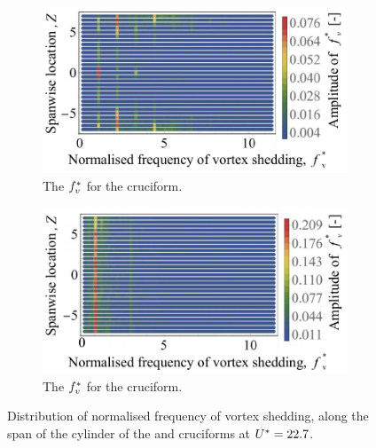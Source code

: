 \documentclass[oneside]{utmthesis}
\begin{document}
\begin{figure}
  \centering

  \begin{subfigure}[h]{0.46\textwidth}
    \includegraphics[width=\textwidth]{figs/probe225YU10}
    \caption{The $f^{*}_{v}$ for the \angtw{} cruciform.}
    \label{fig:probe225YU10}
  \end{subfigure}
  \hspace{6mm}
  \begin{subfigure}[h]{0.46\textwidth}
    \includegraphics[width=\textwidth]{figs/probe00YU10}
    \caption{The $f^{*}_{v}$ for the \angon{} cruciform.}
    \label{fig:probe00YU10}
  \end{subfigure}

  \caption{Distribution of normalised frequency of vortex shedding, along the span of the cylinder of the \angtw{} and \angon{} cruciforms at $U^{*} = 22.7$.}
  \label{fig:probe22500YU10}
\end{figure}
\end{document}
